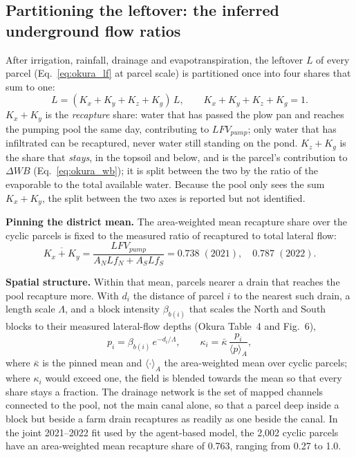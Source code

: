 \documentclass{article}
\begin{document}
\begin{added}
\subsection{Partitioning the leftover: the inferred underground flow ratios}
After irrigation, rainfall, drainage and evapotranspiration, the leftover $L$ of every parcel (Eq.~\ref{eq:okura_lf} at parcel scale) is partitioned once into four shares that sum to one:
\begin{equation}
L = (K_x + K_y + K_z + K_g)\,L, \qquad K_x + K_y + K_z + K_g = 1 .
\end{equation}
$K_x + K_y$ is the \emph{recapture} share: water that has passed the plow pan and reaches the pumping pool the same day, contributing to $LFV_{pump}$; only water that has infiltrated can be recaptured, never water still standing on the pond. $K_z + K_g$ is the share that \emph{stays}, in the topsoil and below, and is the parcel's contribution to $\Delta WB$ (Eq.~\ref{eq:okura_wb}); it is split between the two by the ratio of the evaporable to the total available water. Because the pool only sees the sum $K_x + K_y$, the split between the two axes is reported but not identified.

\textbf{Pinning the district mean.} The area-weighted mean recapture share over the cyclic parcels is fixed to the measured ratio of recaptured to total lateral flow:
\begin{equation}
\overline{K_x + K_y} = \frac{LFV_{pump}}{A_N Lf_N + A_S Lf_S} = 0.738 \;(2021), \quad 0.787 \;(2022).
\end{equation}

\textbf{Spatial structure.} Within that mean, parcels nearer a drain that reaches the pool recapture more. With $d_i$ the distance of parcel $i$ to the nearest such drain, a length scale $\Lambda$, and a block intensity $\beta_{b(i)}$ that scales the North and South blocks to their measured lateral-flow depths (Okura Table~4 and Fig.~6),
\begin{equation}
p_i = \beta_{b(i)}\, e^{-d_i/\Lambda}, \qquad
\kappa_i = \bar\kappa\, \frac{p_i}{\langle p \rangle_A},
\end{equation}
where $\bar\kappa$ is the pinned mean and $\langle\cdot\rangle_A$ the area-weighted mean over cyclic parcels; where $\kappa_i$ would exceed one, the field is blended towards the mean so that every share stays a fraction. The drainage network is the set of mapped channels connected to the pool, not the main canal alone, so that a parcel deep inside a block but beside a farm drain recaptures as readily as one beside the canal. In the joint 2021--2022 fit used by the agent-based model, the 2,002 cyclic parcels have an area-weighted mean recapture share of 0.763, ranging from 0.27 to 1.0.


\end{added}
\end{document}
